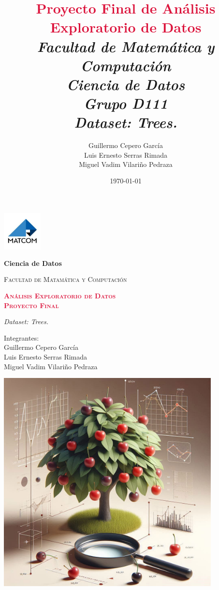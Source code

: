 \documentclass{article}
\title{\textcolor{crimson}{\Large{\textbf{Proyecto Final de Análisis Exploratorio de Datos}}} \\ \normalsize{\textit{Facultad de Matemática y Computación}} \\\normalsize{\textit{Ciencia de Datos \\ Grupo D111}}\\ \textcolor{customGreen}{\large{\textit{Dataset: Trees.}}}}
\author{\textcolor{marron}{\normalsize{Guillermo Cepero García}} \\ \textcolor{marron}{\normalsize{Luis Ernesto Serras Rimada}} \\ \textcolor{marron}{\normalsize{Miguel Vadim Vilariño Pedraza}}}
\date{\today}
\begin{document}
\begin{titlepage}
    \begin{center}
    {\includegraphics[width=0.15\textwidth]{img/matcom.jpg}\par}
    \vspace{0.1cm}
    {\bfseries\LARGE Ciencia de Datos \par}
    \vspace{0.2cm}
    {\scshape\Large  Facultad de Matamática y Computación\par}
    \vspace{0.6cm}
    {\scshape\Huge{\textcolor{crimson}{\textbf{Análisis Exploratorio de Datos \\ Proyecto Final}}} \par}
    \vspace{0.2cm}
    {\itshape\Large \textcolor{customGreen}{\large{\textit{Dataset: Trees.}}} \par}
    \vspace{0.8cm}
    {\large \textcolor{marron}{Integrantes:} \\ \normalsize{Guillermo Cepero García} \\ \normalsize{Luis Ernesto Serras Rimada} \\ \normalsize{Miguel Vadim Vilariño Pedraza} \par}
    \vspace{0.5cm}
    {\includegraphics[width=0.85\textwidth]{img/cherry trees.jpeg}}
    \end{center}
\end{titlepage}
\newpage
\tableofcontents
\lstlistoflistings
\newpage
\end{document}
